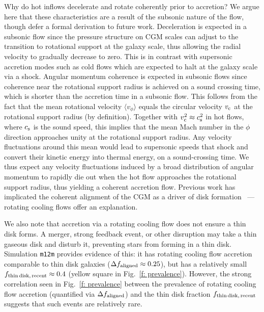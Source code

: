 \documentclass[fleqn,usenatbib]{mnras}
\begin{document}
Why do hot inflows decelerate and rotate coherently prior to accretion?
We argue here that these characteristics are a result of the subsonic nature of the flow, though defer a formal derivation to future work. 
Deceleration is expected in a subsonic flow since the pressure structure on CGM scales can adjust to the transition to rotational support at the galaxy scale, thus allowing the radial velocity to gradually decrease to zero.
This is in contrast with supersonic accretion modes such as cold flows which are expected to halt at the galaxy scale via a shock. 
Angular momentum coherence is expected in subsonic flows since coherence near the rotational support radius is achieved on a sound crossing time, which is shorter than the accretion time in a subsonic flow.
This follows from the fact that the mean rotational velocity $\langle v_\phi \rangle$ equals the circular velocity $v_{\rm c}$ at the rotational support radius (by definition).
Together with  $v_{\rm c}^2\approx c_{\rm s}^2$ in hot flows, where $c_{\rm s}$ is the sound speed, this implies that the mean Mach number in the $\phi$ direction approaches unity at the rotational support radius.
Any velocity fluctuations around this mean would lead to supersonic speeds that shock and convert their kinetic energy into thermal energy, on a sound-crossing time.
We thus expect any velocity fluctuations induced by a broad distribution of angular momentum to rapidly die out when the hot flow approaches the rotational support radius, thus yielding a coherent accretion flow.
Previous work has implicated the coherent alignment of the CGM as a driver of disk formation~\citep{Sales2012, Kretschmer2020} --- rotating cooling flows offer an explanation.

We also note that accretion via a rotating cooling flow does not ensure a thin disk forms. 
A merger, strong feedback event, or other disruption may take a thin gaseous disk and disturb it, preventing stars from forming in a thin disk.
Simulation \texttt{m12m} provides evidence of this:
it has rotating cooling flow accretion comparable to thin disk galaxies ($\Delta f_{\rm aligned} \approx 0.25$), but has a relatively small $f_{\rm thin\,disk,\,recent} \approx 0.4$ (yellow square in Fig.~\ref{f: prevalence}).
However, the strong correlation seen in Fig.~\ref{f: prevalence} between the prevalence of rotating cooling flow accretion (quantified via $\Delta f_{\rm aligned}$) and the thin disk fraction $f_{\rm thin\,disk,\,recent}$ suggests that such events are relatively rare. 
\end{document}
